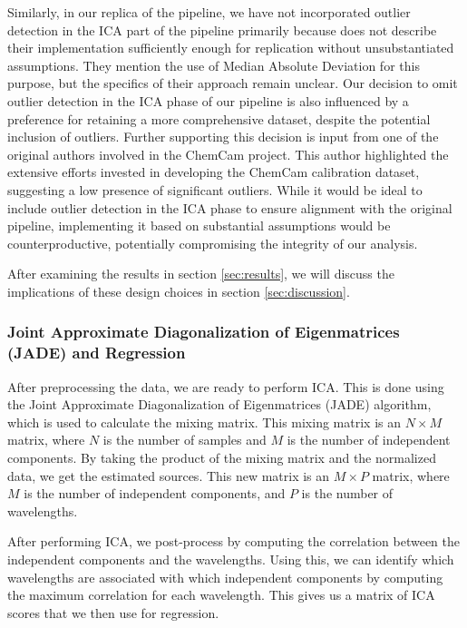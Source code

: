 Similarly, in our replica of the pipeline, we have not incorporated outlier detection in the ICA part of the pipeline primarily because \citet{cleggRecalibrationMarsScience2017} does not describe their implementation sufficiently enough for replication without unsubstantiated assumptions.
They mention the use of Median Absolute Deviation for this purpose, but the specifics of their approach remain unclear.
Our decision to omit outlier detection in the ICA phase of our pipeline is also influenced by a preference for retaining a more comprehensive dataset, despite the potential inclusion of outliers.
Further supporting this decision is input from one of the original authors involved in the ChemCam project.
This author highlighted the extensive efforts invested in developing the ChemCam calibration dataset, suggesting a low presence of significant outliers.
While it would be ideal to include outlier detection in the ICA phase to ensure alignment with the original pipeline, implementing it based on substantial assumptions would be counterproductive, potentially compromising the integrity of our analysis.

After examining the results in section \ref{sec:results}, we will discuss the implications of these design choices in section \ref{sec:discussion}.

\subsubsection{Joint Approximate Diagonalization of Eigenmatrices (JADE) and Regression}
After preprocessing the data, we are ready to perform ICA.
This is done using the Joint Approximate Diagonalization of Eigenmatrices (JADE) algorithm, which is used to calculate the mixing matrix.
This mixing matrix is an $N \times M$ matrix, where $N$ is the number of samples and $M$ is the number of independent components.
By taking the product of the mixing matrix and the normalized data, we get the estimated sources.
This new matrix is an $M \times P$ matrix, where $M$ is the number of independent components, and $P$ is the number of wavelengths.

After performing ICA, we post-process by computing the correlation between the independent components and the wavelengths.
Using this, we can identify which wavelengths are associated with which independent components by computing the maximum correlation for each wavelength.
This gives us a matrix of ICA scores that we then use for regression.

